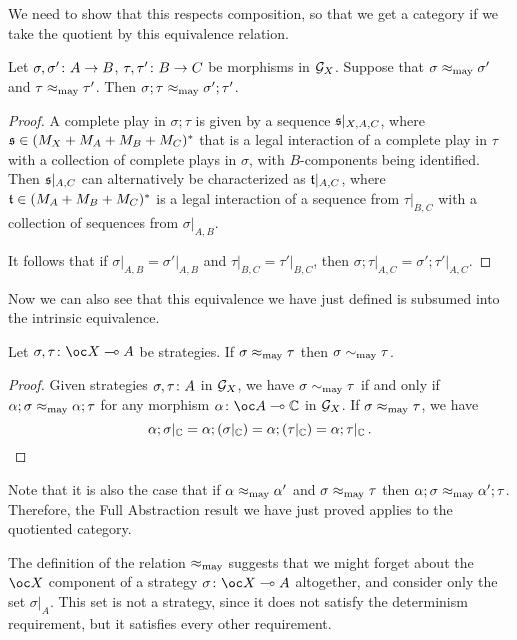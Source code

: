 \documentclass{article}
\begin{document}
We need to show that this respects composition, so that we get a category if we take the quotient by this equivalence relation.
\begin{proposition}
  Let $\sigma,\sigma' \colon A \to B$, $\tau,\tau'\colon B \to C$ be morphisms in $\mathcal G_X$.
  Suppose that $\sigma\approx_{\operatorname{may}}\sigma'$ and $\tau\approx_{\operatorname{may}}\tau'$.  
  Then $\sigma;\tau \approx_{\operatorname{may}} \sigma';\tau'$.
\end{proposition}
\begin{proof}
  A complete play in $\sigma;\tau$ is given by a sequence $\mathfrak s\vert_{X,A,C}$, where $\mathfrak s\in (M_X + M_A + M_B + M_C)^*$ that is a legal interaction of a complete play in $\tau$ with a collection of complete plays in $\sigma$, with $B$-components being identified.
  Then $\mathfrak s\vert_{A,C}$ can alternatively be characterized as $\mathfrak t\vert_{A,C}$, where $\mathfrak t\in (M_A + M_B + M_C)^*$ is a legal interaction of a sequence from $\tau\vert_{B,C}$ with a collection of sequences from $\sigma\vert_{A,B}$.  

  It follows that if $\sigma\vert_{A,B}=\sigma'\vert_{A,B}$ and $\tau\vert_{B,C}=\tau'\vert_{B,C}$, then $\sigma;\tau\vert_{A,C} = \sigma';\tau'\vert_{A,C}$.
\end{proof}

Now we can also see that this equivalence we have just defined is subsumed into the intrinsic equivalence.
\begin{proposition}
  Let $\sigma,\tau\from \oc X \implies A$ be strategies.  
  If $\sigma\approx_{\operatorname{may}}\tau$ then $\sigma\sim_{\operatorname{may}} \tau$.
\end{proposition}
\begin{proof}
  Given strategies $\sigma,\tau\colon A$ in $\mathcal G_X$, we have $\sigma \sim_{\operatorname{may}} \tau$ if and only if $\alpha;\sigma\approx_{\operatorname{may}}\alpha;\tau$ for any morphism $\alpha\from \oc A \implies \bC$ in $\mathcal G_X$.
  If $\sigma\approx_{\operatorname{may}}\tau$, we have
  \[
    \alpha;\sigma\vert_{\mathbb{C}} = \alpha;(\sigma\vert_{\mathbb{C}}) = \alpha;(\tau\vert_{\mathbb{C}}) = \alpha;\tau\vert_{\mathbb{C}}\,.\qedhere
    \]
\end{proof}

Note that it is also the case that if $\alpha\approx_{\operatorname{may}}\alpha'$ and $\sigma\approx_{\operatorname{may}}\tau$ then $\alpha;\sigma \approx_{\operatorname{may}} \alpha';\tau$.  
Therefore, the Full Abstraction result we have just proved applies to the quotiented category.

The definition of the relation $\approx_{\operatorname{may}}$ suggests that we might forget about the $\oc X$ component of a strategy $\sigma\from\oc X \implies A$ altogether, and consider only the set $\sigma\vert_A$.  
This set is not a strategy, since it does not satisfy the determinism requirement, but it satisfies every other requirement.
\end{document}
